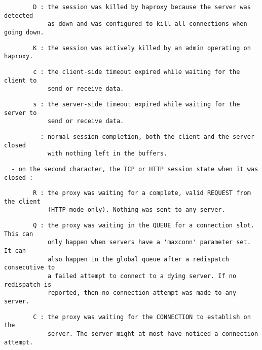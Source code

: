 \begin{verbatim}
        D : the session was killed by haproxy because the server was detected
            as down and was configured to kill all connections when going down.
\end{verbatim}

\begin{verbatim}
        K : the session was actively killed by an admin operating on haproxy.
\end{verbatim}

\begin{verbatim}
        c : the client-side timeout expired while waiting for the client to
            send or receive data.
\end{verbatim}

\begin{verbatim}
        s : the server-side timeout expired while waiting for the server to
            send or receive data.
\end{verbatim}

\begin{verbatim}
        - : normal session completion, both the client and the server closed
            with nothing left in the buffers.
\end{verbatim}

\begin{verbatim}
  - on the second character, the TCP or HTTP session state when it was closed :
\end{verbatim}

\begin{verbatim}
        R : the proxy was waiting for a complete, valid REQUEST from the client
            (HTTP mode only). Nothing was sent to any server.
\end{verbatim}

\begin{verbatim}
        Q : the proxy was waiting in the QUEUE for a connection slot. This can
            only happen when servers have a 'maxconn' parameter set. It can
            also happen in the global queue after a redispatch consecutive to
            a failed attempt to connect to a dying server. If no redispatch is
            reported, then no connection attempt was made to any server.
\end{verbatim}

\begin{verbatim}
        C : the proxy was waiting for the CONNECTION to establish on the
            server. The server might at most have noticed a connection attempt.
\end{verbatim}

